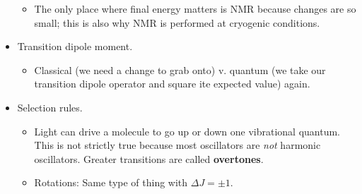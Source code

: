 \documentclass[../notes.tex]{subfiles}
\begin{document}
\begin{itemize}
\begin{itemize}
        \item The only place where final energy matters is NMR because changes are so small; this is also why NMR is performed at cryogenic conditions.
    \end{itemize}
    \item Transition dipole moment.
    \begin{itemize}
        \item Classical (we need a change to grab onto) v. quantum (we take our transition dipole operator and square ite expected value) again.
    \end{itemize}
    \item Selection rules.
    \begin{itemize}
        \item Light can drive a molecule to go up or down one vibrational quantum. This is not strictly true because most oscillators are \emph{not} harmonic oscillators. Greater transitions are called \textbf{overtones}.
        \item Rotations: Same type of thing with $\Delta J=\pm 1$.
    \end{itemize}
\end{itemize}
\end{document}
